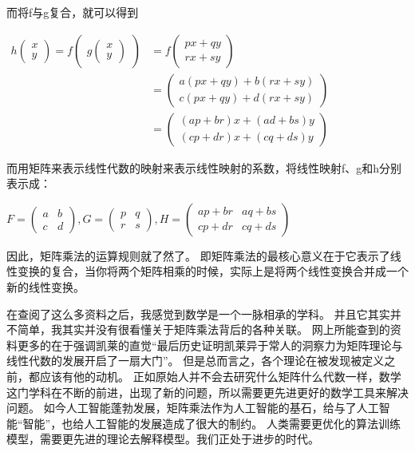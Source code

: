 \documentclass[a4paper]{article}%
\begin{document}
而将f与g复合，就可以得到

\begin{center}
$
\begin{aligned}
h\begin{pmatrix}
    x \\
    y
\end{pmatrix}=f\begin{pmatrix}
    g\begin{pmatrix}
        x \\
        y
    \end{pmatrix}
\end{pmatrix}&=f\begin{pmatrix}
    px+qy \\
    rx+sy
\end{pmatrix}\\&=
\begin{pmatrix}
    a(px+qy)+b(rx+sy) \\
    c(px+qy)+d(rx+sy)
\end{pmatrix}
    \\&=
    \begin{pmatrix}
        (ap+br)x+(ad+bs)y \\
        (cp+dr)x+(cq+ds)y
    \end{pmatrix}
\end{aligned}
$
\end{center}
而用矩阵来表示线性代数的映射来表示线性映射的系数，将线性映射f、g和h分别表示成：

\begin{center}
$
F=\begin{pmatrix}
    a & b \\
    c & d
\end{pmatrix}, G=\begin{pmatrix}
    p & q \\
    r & s
\end{pmatrix}, H=\begin{pmatrix}
    ap+br & aq+bs \\
    cp+dr & cq+ds
\end{pmatrix}
$
\end{center}

因此，矩阵乘法的运算规则就了然了。
即矩阵乘法的最核心意义在于它表示了线性变换的复合，当你将两个矩阵相乘的时候，实际上是将两个线性变换合并成一个新的线性变换。

在查阅了这么多资料之后，我感觉到数学是一个一脉相承的学科。
并且它其实并不简单，我其实并没有很看懂关于矩阵乘法背后的各种关联。
网上所能查到的资料更多的在于强调凯莱的直觉“最后历史证明凯莱异于常人的洞察力为矩阵理论与线性代数的发展开启了一扇大门”。
但是总而言之，各个理论在被发现被定义之前，都应该有他的动机。
正如原始人并不会去研究什么矩阵什么代数一样，数学这门学科在不断的前进，出现了新的问题，所以需要更先进更好的数学工具来解决问题。
如今人工智能蓬勃发展，矩阵乘法作为人工智能的基石，给与了人工智能“智能”，也给人工智能的发展造成了很大的制约。
人类需要更优化的算法训练模型，需要更先进的理论去解释模型。我们正处于进步的时代。
\end{document}

